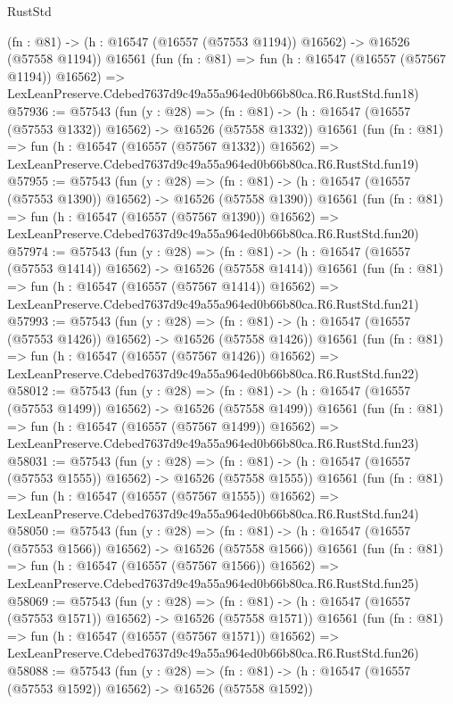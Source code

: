 \begin{lexlean}{RustStd}
\begin{coremodule}
    (fn : @81) -> (h : @16547 (@16557 (@57553 @1194)) @16562) -> @16526 (@57558 @1194))
    @16561
    (fun (fn : @81) =>
    fun (h : @16547 (@16557 (@57567 @1194)) @16562) =>
    LexLeanPreserve.Cdebed7637d9c49a55a964ed0b66b80ca.R6.RustStd.fun18)
@57936 := @57543
    (fun (y : @28) =>
    (fn : @81) -> (h : @16547 (@16557 (@57553 @1332)) @16562) -> @16526 (@57558 @1332))
    @16561
    (fun (fn : @81) =>
    fun (h : @16547 (@16557 (@57567 @1332)) @16562) =>
    LexLeanPreserve.Cdebed7637d9c49a55a964ed0b66b80ca.R6.RustStd.fun19)
@57955 := @57543
    (fun (y : @28) =>
    (fn : @81) -> (h : @16547 (@16557 (@57553 @1390)) @16562) -> @16526 (@57558 @1390))
    @16561
    (fun (fn : @81) =>
    fun (h : @16547 (@16557 (@57567 @1390)) @16562) =>
    LexLeanPreserve.Cdebed7637d9c49a55a964ed0b66b80ca.R6.RustStd.fun20)
@57974 := @57543
    (fun (y : @28) =>
    (fn : @81) -> (h : @16547 (@16557 (@57553 @1414)) @16562) -> @16526 (@57558 @1414))
    @16561
    (fun (fn : @81) =>
    fun (h : @16547 (@16557 (@57567 @1414)) @16562) =>
    LexLeanPreserve.Cdebed7637d9c49a55a964ed0b66b80ca.R6.RustStd.fun21)
@57993 := @57543
    (fun (y : @28) =>
    (fn : @81) -> (h : @16547 (@16557 (@57553 @1426)) @16562) -> @16526 (@57558 @1426))
    @16561
    (fun (fn : @81) =>
    fun (h : @16547 (@16557 (@57567 @1426)) @16562) =>
    LexLeanPreserve.Cdebed7637d9c49a55a964ed0b66b80ca.R6.RustStd.fun22)
@58012 := @57543
    (fun (y : @28) =>
    (fn : @81) -> (h : @16547 (@16557 (@57553 @1499)) @16562) -> @16526 (@57558 @1499))
    @16561
    (fun (fn : @81) =>
    fun (h : @16547 (@16557 (@57567 @1499)) @16562) =>
    LexLeanPreserve.Cdebed7637d9c49a55a964ed0b66b80ca.R6.RustStd.fun23)
@58031 := @57543
    (fun (y : @28) =>
    (fn : @81) -> (h : @16547 (@16557 (@57553 @1555)) @16562) -> @16526 (@57558 @1555))
    @16561
    (fun (fn : @81) =>
    fun (h : @16547 (@16557 (@57567 @1555)) @16562) =>
    LexLeanPreserve.Cdebed7637d9c49a55a964ed0b66b80ca.R6.RustStd.fun24)
@58050 := @57543
    (fun (y : @28) =>
    (fn : @81) -> (h : @16547 (@16557 (@57553 @1566)) @16562) -> @16526 (@57558 @1566))
    @16561
    (fun (fn : @81) =>
    fun (h : @16547 (@16557 (@57567 @1566)) @16562) =>
    LexLeanPreserve.Cdebed7637d9c49a55a964ed0b66b80ca.R6.RustStd.fun25)
@58069 := @57543
    (fun (y : @28) =>
    (fn : @81) -> (h : @16547 (@16557 (@57553 @1571)) @16562) -> @16526 (@57558 @1571))
    @16561
    (fun (fn : @81) =>
    fun (h : @16547 (@16557 (@57567 @1571)) @16562) =>
    LexLeanPreserve.Cdebed7637d9c49a55a964ed0b66b80ca.R6.RustStd.fun26)
@58088 := @57543
    (fun (y : @28) =>
    (fn : @81) -> (h : @16547 (@16557 (@57553 @1592)) @16562) -> @16526 (@57558 @1592))

\end{coremodule}
\end{lexlean}
